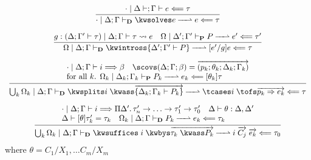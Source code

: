 \[
  \begin{array}{c}
  \infer{%
    \dirtransjudg{\cdot \mid \goalctx{}}{\kwsolves e}{e}{\tau}
  }{\belchkjudg{\cdot \mid \goalctx }{e}\tau}
    \\[1em]
  \infer{%
    \dirtransjudg{\Omega \mid \goalctx{}}{%
      \kwintross \hypoth{\goalctx{^\prime}}{P}%
    }{\psubst{e^\prime/g}{e}}{\tau}
  }{%
    \unrolljudg{\goal{^\prime}}{\goalctx{}}{e}{\tau}
    &
    \prftransjudg{\Omega \mid \goalctx{^\prime}}{P}{e^\prime}{\tau^\prime}
  }
    \\[1em]
  \infer{%
    \dirtransjudg{\Union_k \Omega_k \mid \goalctx{}}{%
      \kwsplits i\;\kwass \vec{\hypoth{\goalctx{_k}}{P_k}}
    }{%
      \tcases i\;\tofs \vec{p_k \bto e_k}
    }{\tau}
  }{%
    \begin{array}{l}
    \belsynjudg{\cdot\mid\goalctx{}}{i}{\beta}
      \quad
    \scovs (\Delta; \Gamma; \beta) =
    \vec{(p_k; \theta_k; \Delta_k; \Gamma_k)}
      \\
    \text{for all $k$. }
    \prftransjudg{\Omega_k \mid \goalctx{_k}}{P_k}{e_k}{%
      \msubst{\theta_k}{\tau}%
    }
    \end{array}
  }
      \\[1em]
  \infer{%
    \dirtransjudg{\Union_k \Omega_k \mid \goalctx{}}{%
      \kwsuffices\;i\;\kwbys \vec{\tau_k \;\kwass P_k}
    }{i\;\vec{C_j}\;\vec{e_k}}{\tau_0}}
   {%
     \begin{array}{l}
       \belsynjudg{\cdot \mid \goalctx{}}{i}{%
         \Pi \Delta^\prime.\,
         \tau_n^\prime \to \ldots \to \tau_1^\prime \to \tau_0^\prime%
       }
       \quad
       \Delta \vdash \theta : \Delta, \Delta^\prime
       \\
       \Delta \vdash \msubst{\theta}{\tau_k^\prime} = \tau_k
       \quad
       \dirtransjudg{\Omega_k \mid \goalctx{}}{P_k}{e_k}{\tau_k}
     \end{array}
  }
    \end{array}
\]%
\mbox{where} $\theta = C_1/X_1, \ldots C_m/X_m$%
%
